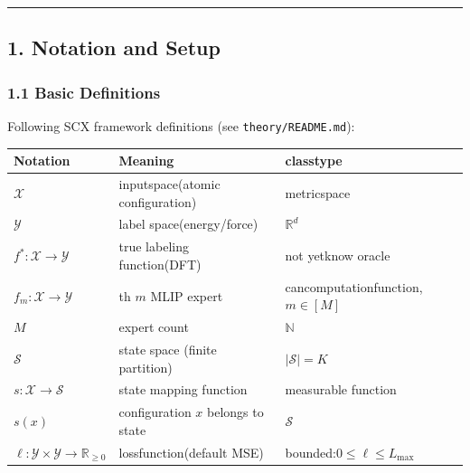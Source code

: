 \documentclass[
  12pt,
]{article}
\begin{document}
\begin{center}\rule{0.5\linewidth}{0.5pt}\end{center}

\subsection{1. Notation and Setup}\label{ux7b26ux53f7ux4e0eux8bbeux5b9a}

\subsubsection{1.1 Basic Definitions}\label{ux57faux7840ux5b9aux4e49}

Following SCX framework definitions (see \texttt{theory/README.md}):

\begin{longtable}[]{@{}
  >{\raggedright\arraybackslash}p{}
  >{\raggedright\arraybackslash}p{}
  >{\raggedright\arraybackslash}p{}@{}}
\toprule\noalign{}
\begin{minipage}[b]{\linewidth}\raggedright
Notation
\end{minipage} & \begin{minipage}[b]{\linewidth}\raggedright
Meaning
\end{minipage} & \begin{minipage}[b]{\linewidth}\raggedright
classtype
\end{minipage} \\
\midrule\noalign{}
\endhead
\bottomrule\noalign{}
\endlastfoot
\(\mathcal{X}\) & inputspace(atomic configuration) & metricspace \\
\(\mathcal{Y}\) & label space(energy/force) & \(\mathbb{R}^d\) \\
\(f^*: \mathcal{X} \to \mathcal{Y}\) & true labeling function(DFT) & not yetknow
oracle \\
\(f_m: \mathcal{X} \to \mathcal{Y}\) & th \(m\)  MLIP expert &
cancomputationfunction,\(m \in [M]\) \\
\(M\) & expert count & \(\mathbb{N}\) \\
\(\mathcal{S}\) & state space (finite partition) & \(|\mathcal{S}| = K\) \\
\(s: \mathcal{X} \to \mathcal{S}\) & state mapping function & measurable function \\
\(s(x)\) & configuration \(x\) belongs to state & \(\mathcal{S}\) \\
\(\ell: \mathcal{Y} \times \mathcal{Y} \to \mathbb{R}_{\ge 0}\) &
lossfunction(default MSE) & bounded:\(0 \le \ell \le L_{\max}\) \\
\end{longtable}
\end{document}
